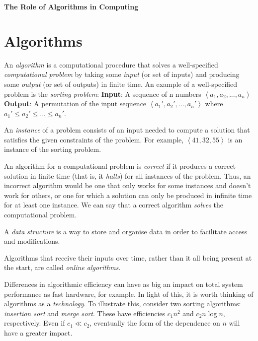 \documentclass[12pt]{article}
\begin{document}
\begin{center}\LARGE\bf
    The Role of Algorithms in Computing
\end{center}

\section{Algorithms}
An \textit{algorithm} is a computational procedure that solves a well-specified \textit{computational problem} by taking some \textit{input} (or set
of inputs) and producing some \textit{output} (or set of outputs) in finite time. An example of a well-specified problem is the \textit{sorting
problem}:
\newline\textbf{Input}: A sequence of n numbers $\left\langle a_1, a_2, ..., a_n\right\rangle$
\newline\textbf{Output}: A permutation of the input sequence $\left\langle a_1', a_2', ..., a_n' \right\rangle$ where $a_1' \leq  a_2' \leq ... \leq a_n'$.

An \textit{instance} of a problem consists of an input needed to compute a solution that satisfies the given constraints of the problem. For example,
$\left\langle 41, 32, 55 \right\rangle$ is an instance of the sorting problem.

An algorithm for a computational problem is \textit{correct} if it produces a correct solution in finite time (that is, it \textit{halts}) for all instances of the problem. Thus,
an incorrect algorithm would be one that only works for some instances and doesn't work for others, or one for which a solution can only be produced in
infinite time for at least one instance. We can say that a correct algorithm \textit{solves} the computational problem.

A \textit{data structure} is a way to store and organise data in order to facilitate access and modifications.

Algorithms that receive their inputs over time, rather than it all being present at the start, are called \textit{online algorithms}.

Differences in algorithmic efficiency can have as big an impact on total system performance as fast hardware, for example.
In light of this, it is worth thinking of algorithms as a \textit{technology}. To illustrate this, consider two
sorting algorithms: \textit{insertion sort} and \textit{merge sort}. These have efficiencies $c_1n^2$ and $c_2n\log n$, respectively.
Even if $c_1 \ll c_2$, eventually the form of the dependence on $n$ will have a greater impact.
\end{document}
